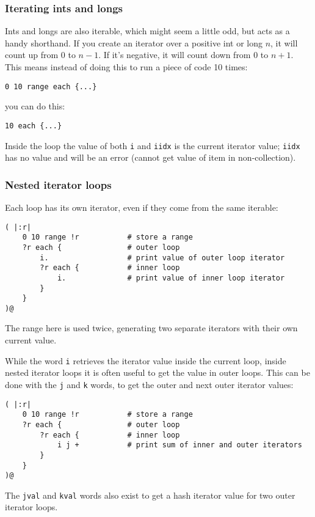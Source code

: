 \subsubsection{Iterating ints and longs}
Ints and longs are also iterable, which might seem a little odd,
but acts as a handy shorthand. If you create an iterator over a positive int
or long $n$, it will count up from 0 to $n-1$. If it's negative, it will
count down from 0 to $n+1$. This means instead of doing this to run
a piece of code 10 times:
\begin{lstlisting}
0 10 range each {...}
\end{lstlisting}
you can do this:
\begin{lstlisting}
10 each {...}
\end{lstlisting}
Inside the loop the value of both \texttt{i} and \texttt{iidx} is the
current iterator value; \texttt{iidx} has no value and will be an error
(cannot get value of item in non-collection).



\subsubsection{Nested iterator loops}
\label{nestit}
Each loop has its own iterator, even if they come from the same iterable:
\begin{lstlisting}
( |:r|
    0 10 range !r           # store a range
    ?r each {               # outer loop
        i.                  # print value of outer loop iterator
        ?r each {           # inner loop
            i.              # print value of inner loop iterator
        }
    }
)@
\end{lstlisting}
The range here is used twice, generating two separate iterators with
their own current value.

While the word \texttt{i} retrieves the iterator value inside the current
loop, inside nested iterator loops it is often useful to get the value
in outer loops. This can be done with the \texttt{j} and \texttt{k} words,
to get the outer and next outer iterator values:
\begin{lstlisting}
( |:r|
    0 10 range !r           # store a range
    ?r each {               # outer loop
        ?r each {           # inner loop
            i j +           # print sum of inner and outer iterators
        }
    }
)@  
\end{lstlisting}
The \texttt{jval} and \texttt{kval}
words also exist to get a hash iterator value for two outer iterator loops.

